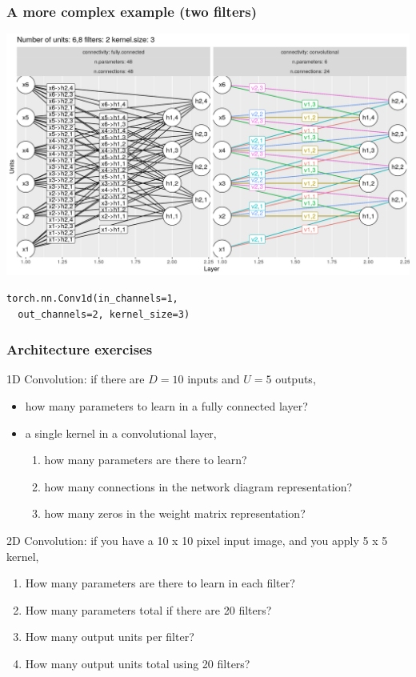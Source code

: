 \documentclass{beamer}
\begin{document}
\begin{frame}[fragile]
  \frametitle{A more complex example (two filters)}
  \includegraphics[width=\textwidth]{figure-convolutional-filters-6-3-2}
   
\begin{verbatim}
torch.nn.Conv1d(in_channels=1, 
  out_channels=2, kernel_size=3)
\end{verbatim}
  
\end{frame}

\begin{frame}
  \frametitle{Architecture exercises}
  1D Convolution: if there are $D=10$ inputs and $U=5$ outputs, 
  \begin{itemize}
  \item how many parameters to learn in a fully
    connected layer?
  \item a single kernel in a convolutional layer,
    \begin{enumerate}
    \item how many parameters are there to learn?
    \item how many connections in the network diagram
      representation?
    \item how many zeros in the weight matrix
      representation?
    \end{enumerate}
  \end{itemize}

  2D Convolution: if you have a 10 x 10 pixel input image, and you
  apply 5 x 5 kernel,
  \begin{enumerate}
  \item How many parameters are there to learn in each filter?
  \item How many parameters total if there are 20 filters?
  \item How many output units per filter?
  \item How many output units total using 20 filters?
  \end{enumerate}
\end{frame}
\end{document}

